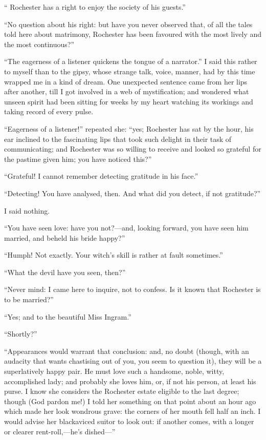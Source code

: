 \enquote{\Mr{} Rochester has a right to enjoy the society of his guests.}

\enquote{No question about his right: but have you never observed that,
of all the tales told here about matrimony, \Mr{} Rochester has been
favoured with the most lively and the most continuous?}

\enquote{The eagerness of a listener quickens the tongue of a
narrator.} I said this rather to myself than to the gipsy, whose
strange talk, voice, manner, had by this time wrapped me in a kind of
dream. One unexpected sentence came from her lips after another, till I
got involved in a web of mystification; and wondered what unseen spirit
had been sitting for weeks by my heart watching its workings and taking
record of every pulse.

\enquote{Eagerness of a listener!} repeated she: \enquote{yes; \Mr{}
 Rochester has sat by the hour, his ear inclined to the fascinating lips
that took such delight in their task of communicating; and \Mr{} Rochester
was so willing to receive and looked so grateful for the pastime given
him; you have noticed this?}

\enquote{Grateful! I cannot remember detecting gratitude in his face.}

\enquote{Detecting! You have analysed, then. And what did you detect,
if not gratitude?}

I said nothing.

\enquote{You have seen love: have you not?---and, looking forward, you
have seen him married, and beheld his bride happy?}

\enquote{Humph! Not exactly. Your witch's skill is rather at fault
sometimes.}

\enquote{What the devil have you seen, then?}

\enquote{Never mind: I came here to inquire, not to confess. Is it
known that \Mr{} Rochester is to be married?}

\enquote{Yes; and to the beautiful Miss Ingram.}

\enquote{Shortly?}

\enquote{Appearances would warrant that conclusion: and, no doubt
(though, with an audacity that wants chastising out of you, you seem to
question it), they will be a superlatively happy pair. He must love
such a handsome, noble, witty, accomplished lady; and probably she loves
him, or, if not his person, at least his purse. I know she considers
the Rochester estate eligible to the last degree; though (God pardon
me!) I told her something on that point about an hour ago which made her
look wondrous grave: the corners of her mouth fell half an inch. I
would advise her blackaviced suitor to look out: if another comes, with
a longer or clearer rent-roll,---he's dished---}

